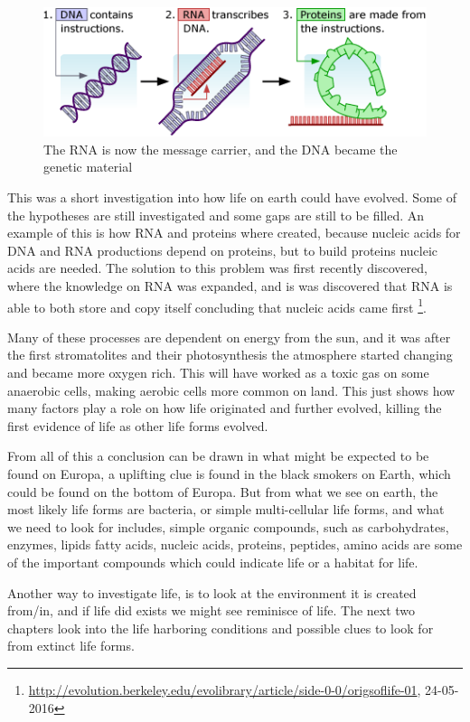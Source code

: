 \begin{figure}[htb]
  \centering
  \includegraphics[width=\textwidth]{figures/Life/dnarnaprotein}
  \caption{The RNA is now the message carrier, and the DNA became the genetic material}
  \label{fig:RNAtoDNA}
\end{figure}
This was a short investigation into how life on earth could have evolved. Some of the hypotheses are still investigated and some gaps are still to be filled. An example of this is how RNA and proteins where created, because nucleic acids for DNA and RNA productions depend on proteins, but to build proteins nucleic acids are needed. The solution to this problem was first recently discovered, where the knowledge on RNA was expanded, and is was discovered that RNA is able to both store and copy itself concluding that nucleic acids came first \footnote{\url{http://evolution.berkeley.edu/evolibrary/article/side-0-0/origsoflife-01}, 24-05-2016}.

Many of these processes are dependent on energy from the sun, and it was after the first stromatolites and their photosynthesis the atmosphere started changing and became more oxygen rich. This will have worked as a toxic gas on some anaerobic cells, making aerobic cells more common on land. This just shows how many factors play a role on how life originated and further evolved, killing the first evidence of life as other life forms evolved.

From all of this a conclusion can be drawn in what might be expected to be found on Europa, a uplifting clue is found in the black smokers on Earth, which could be found on the bottom of Europa. But from what we see on earth, the most likely life forms are bacteria, or simple multi-cellular life forms, and what we need to look for includes, simple organic compounds, such as carbohydrates, enzymes, lipids fatty acids, nucleic acids, proteins, peptides, amino acids are some of the important compounds which could indicate life or a habitat for life.

Another way to investigate life, is to look at the environment it is created from/in, and if life did exists we might see reminisce of life. The next two chapters look into the life harboring conditions and possible clues to look for from extinct life forms.

